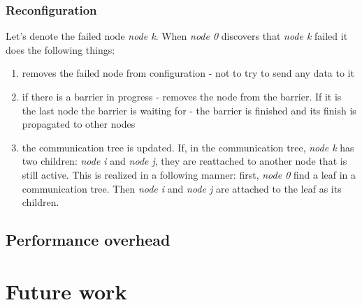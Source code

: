 \documentclass{llncs}
\begin{document}
\subsubsection{Reconfiguration}
Let's denote the failed node \emph{node k}.
When \emph{node 0} discovers that \emph{node k} failed it does the following things:
\begin{enumerate}
\item removes the failed node from configuration - not to try to send any data to it
\item if there is a barrier in progress - removes the node from the barrier.
If it is the last node the barrier is waiting for - the barrier is finished and its finish is propagated to other nodes   %
\item the communication tree is updated. If, in the communication tree, \emph{node k} has two children: \emph{node i} and \emph{node j},
  they are reattached to another node that is still active. This is realized in a following manner: first, \emph{node 0} find a leaf in a communication tree.
  Then \emph{node i} and \emph{node j} are attached to the leaf as its children.
\end{enumerate}


\subsection{Performance overhead}

\section{Future work}
\end{document}
